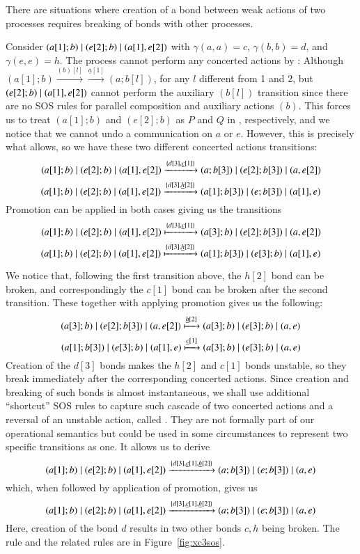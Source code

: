 {There are situations where creation of a bond between weak actions of two processes requires breaking of bonds with other processes. %

\begin{example}\label{ex:concert3}
{\rm Consider $(a[1];b)\; \vert \; (e[2];b)\; \vert \; (a[1],e[2])$ with $\gamma(a,a)=c$, $\gamma(b,b)=d$, and
$\gamma(e,e)=h$.
The process cannot perform any concerted actions by : Although $(a[1];b)  \xrightarrow{(b)[l]} 
\xrightarrow{\underline{a}[1]} (a;b[l])$, for any $l$ different from 1 and 2, but
$(e[2];b)\; \vert \; (a[1],e[2])$  cannot perform the auxiliary $(b[l])$
transition since there are no SOS rules for parallel composition and auxiliary actions $(b)$. This forces us
to treat $(a[1];b)$ and $ (e[2];b)$ as $P$ and $Q$ in , respectively, and we notice that
we cannot undo a communication on $a$ or $e$. However, this is precisely what  allows, so we have these two different concerted actions transitions:
$$
(a[1];b)\; \vert \; (e[2];b)\; \vert \; (a[1],e[2])  \xrightarrow{\{d[3], \underline{c}[1]\}} 
(a;b[3])\; \vert \; (e[2];b[3])\; \vert \; (a,e[2])
$$ 
$$
(a[1];b)\; \vert \; (e[2];b)\; \vert \; (a[1],e[2])  \xrightarrow{\{d[3], \underline{h}[2]\}} 
(a[1];b[3])\; \vert \; (e;b[3])\; \vert \; (a[1],e)
$$ 
Promotion can be applied in both cases giving us the transitions
$$
(a[1];b)\; \vert \; (e[2];b)\; \vert \; (a[1],e[2])  \xmapsto{\{d[3], \underline{c}[1]\}} 
(a[3];b)\; \vert \; (e[2];b[3])\; \vert \; (a,e[2])
$$ 
$$
(a[1];b)\; \vert \; (e[2];b)\; \vert \; (a[1],e[2])  \xmapsto{\{d[3], \underline{h}[2]\}} 
(a[1];b[3])\; \vert \; (e[3];b)\; \vert \; (a[1],e)
$$ 


We notice that, following the first transition above, the $h[2]$ bond can be broken, and correspondingly the $c[1]$ bond can be broken after the second transition. These together with applying promotion gives us the following:
$$
(a[3];b)\; \vert \; (e[2];b[3])\; \vert \; (a,e[2]) \xmapsto{\underline{h}[2]}  (a[3];b)\; \vert \; (e[3];b)\; \vert \; (a,e)
$$ 
$$
(a[1];b[3])\; \vert \; (e[3];b)\; \vert \; (a[1],e)  \xmapsto{\underline{c}[1]} (a[3];b)\; \vert \; (e[3];b)\; \vert \; (a,e) 
$$ 
Creation of the $d[3]$ bonds makes the $h[2]$ and $c[1]$ bonds unstable, so they break immediately
after the corresponding concerted actions. Since creation and breaking of such bonds is almost instantaneous, we shall use additional
``shortcut'' SOS rules to capture such cascade of two concerted actions and a reversal of an unstable action, called . They are not formally part of our operational semantics but could be used in some circumstances 
to represent two specific transitions as one. It allows us to derive
$$
(a[1];b)\; \vert \; (e[2];b)\; \vert \; (a[1],e[2])  \xrightarrow{\{d[3], \underline{c}[1], \underline{h}[2]\}} 
(a;b[3])\; \vert \; (e;b[3])\; \vert \; (a,e) 
$$ 
which, when followed by application of promotion, gives us
$$
(a[1];b)\; \vert \; (e[2];b)\; \vert \; (a[1],e[2])  \xrightarrow{\{d[3], \underline{c}[1], \underline{h}[2]\}} 
(a;b[3])\; \vert \; (e;b[3])\; \vert \; (a,e) 
$$ 
Here, creation of the bond $d$ results in two other bonds $c, h$ being broken. The rule  and the related rules
are in Figure~\ref{fig:xc3sos}.}
\end{example}

}
